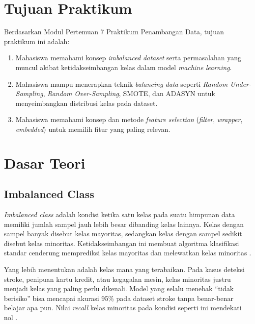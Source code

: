 \documentclass[a4paper,oneside,12pt]{report}
\begin{document}
\setcounter{page}{3}

\chapter[Tujuan Praktikum]{Tujuan Praktikum}
Berdasarkan Modul Pertemuan 7 Praktikum Penambangan Data, tujuan praktikum ini adalah:
\begin{enumerate}[noitemsep, topsep=4pt, parsep=2pt]
   \item Mahasiswa memahami konsep \textit{imbalanced dataset} serta permasalahan yang muncul akibat ketidakseimbangan kelas dalam model \textit{machine learning}.
   \item Mahasiswa mampu menerapkan teknik \textit{balancing data} seperti \textit{Random Under-Sampling}, \textit{Random Over-Sampling}, SMOTE, dan ADASYN untuk menyeimbangkan distribusi kelas pada dataset.
   \item Mahasiswa memahami konsep dan metode \textit{feature selection} (\textit{filter}, \textit{wrapper}, \textit{embedded}) untuk memilih fitur yang paling relevan.
\end{enumerate}

\clearpage

\chapter{Dasar Teori}

\section{Imbalanced Class}
\textit{Imbalanced class} adalah kondisi ketika satu kelas pada suatu himpunan data memiliki jumlah sampel jauh lebih besar dibanding kelas lainnya. Kelas dengan sampel banyak disebut kelas mayoritas, sedangkan kelas dengan sampel sedikit disebut kelas minoritas. Ketidakseimbangan ini membuat algoritma klasifikasi standar cenderung memprediksi kelas mayoritas dan melewatkan kelas minoritas \cite{istiana2023}.

Yang lebih menentukan adalah kelas mana yang terabaikan. Pada kasus deteksi stroke, penipuan kartu kredit, atau kegagalan mesin, kelas minoritas justru menjadi kelas yang paling perlu dikenali. Model yang selalu menebak ``tidak berisiko'' bisa mencapai akurasi 95\% pada dataset stroke tanpa benar-benar belajar apa pun. Nilai \textit{recall} kelas minoritas pada kondisi seperti ini mendekati nol \cite{istiana2023}.
\end{document}

